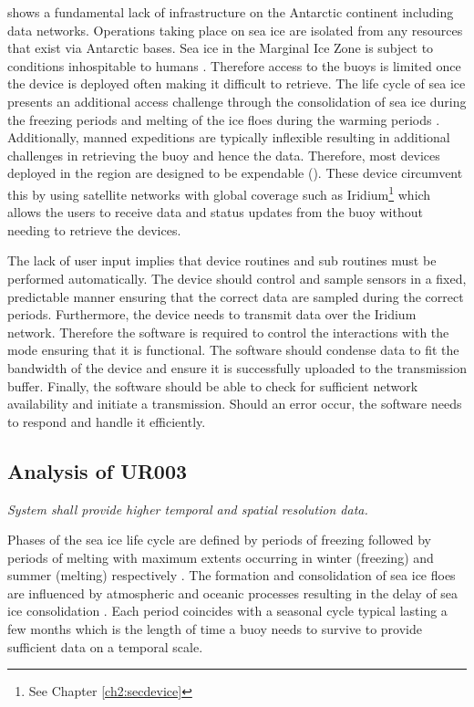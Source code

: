\textcite{kennicutt2016delivering} shows a fundamental lack of infrastructure on the Antarctic continent including data networks. Operations taking place on sea ice are isolated from any resources that exist via Antarctic bases. Sea ice in the Marginal Ice Zone is subject to conditions inhospitable to humans \cite{kennicutt2016delivering}. Therefore access to the buoys is limited once the device is deployed often making it difficult to retrieve. The life cycle of sea ice presents an additional access challenge through the consolidation of sea ice during the freezing periods and melting of the ice floes during the warming periods \cite{womack_2020}. Additionally, manned expeditions are typically inflexible \cite{kennicutt2016delivering} resulting in additional challenges in retrieving the buoy and hence the data. Therefore, most devices deployed in the region are designed to be expendable (\cite{kohout2015device,rabault2019open,trident}). These device circumvent this by using satellite networks with global coverage such as Iridium\footnote{See Chapter \ref{ch2:secdevice}} which allows the users to receive data and status updates from the buoy without needing to retrieve the devices. 

The lack of user input implies that device routines and sub routines must be performed automatically. The device should control and sample sensors in a fixed, predictable manner ensuring that the correct data are sampled during the correct periods. Furthermore, the device needs to transmit data over the Iridium network. Therefore the software is required to control the interactions with the mode ensuring that it is functional. The software should condense data to fit the bandwidth of the device and ensure it is successfully uploaded to the transmission buffer. Finally, the software should be able to check for sufficient network availability and initiate a transmission. Should an error occur, the software needs to respond and handle it efficiently.

\subsection{Analysis of UR003}
\textit{System shall provide higher temporal and spatial resolution data.}

Phases of the sea ice life cycle are defined by periods of freezing followed by periods of melting \cite{barber2005microwave} with maximum extents occurring in winter (freezing) and summer (melting) respectively \cite{barber2005microwave}. The formation and consolidation of sea ice floes are influenced by atmospheric and oceanic processes resulting in the delay of sea ice consolidation \cite{vichi2019effects,albarello2020drift}. Each period coincides with a seasonal cycle typical lasting a few months \cite{vichi2019effects,alberello2019drift,barber1948generation} which is the length of time a buoy needs to survive to provide sufficient data on a temporal scale. \par 

